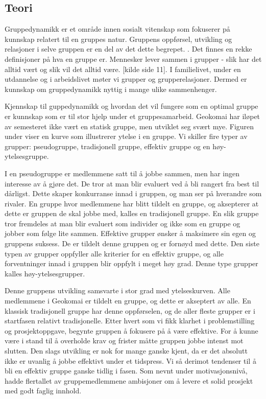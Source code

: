 \documentclass[a4paper,norsk,oneside]{article}
\begin{document}
\subsection{Teori}
Gruppedynamikk er et område innen sosialt vitenskap som fokuserer på kunnskap relatert til en gruppes natur. Gruppens oppførsel, utvikling og relasjoner i selve gruppen er en del av det dette begrepet. \cite{johnson2008joining}. Det finnes en rekke definisjoner på hva en gruppe er. Mennesker lever sammen i grupper - slik har det alltid vært og slik vil det alltid være. [kilde side 11]. I familielivet, under en utdannelse og i arbeidslivet møter vi grupper og grupperelasjoner. Dermed er kunnskap om gruppedynamikk nyttig i mange ulike sammenhenger. 

Kjennskap til guppedynamikk og hvordan det vil fungere som en optimal gruppe er kunnskap som er til stor hjelp under et gruppesamarbeid. Geokomai har iløpet av semesteret ikke vært en statisk gruppe, men utviklet seg svært mye. Figuren under viser en kurve som illustrerer ytelse i en gruppe. Vi skiller fire typer av grupper: pseudogruppe, tradisjonell gruppe, effektiv gruppe og en høy-ytelsesgruppe.\cite{johnson2008joining} 



I en pseudogruppe er medlemmene satt til å jobbe sammen, men har ingen interesse av å gjøre det. De tror at man blir evaluert ved å bli rangert fra best til dårligst. Dette skaper konkurranse innad i gruppen, og man ser på hverandre som rivaler. En gruppe hvor medlemmene har blitt tildelt en gruppe, og aksepterer at dette er gruppen de skal jobbe med, kalles en tradisjonell gruppe. En slik gruppe tror fremdeles at man blir evaluert som individer og ikke som en gruppe og jobber som følge lite sammen. Effektive grupper ønsker å maksimere sin egen og gruppens suksess. De er tildelt denne gruppen og er fornøyd med dette. Den siste typen av grupper oppfyller alle kriterier for en effektiv gruppe, og alle forventninger innad i gruppen blir oppfylt i meget høy grad. Denne type grupper kalles høy-ytelsesgrupper.

Denne gruppens utvikling samsvarte i stor grad med ytelseskurven. Alle medlemmene i Geokomai er tildelt en gruppe, og dette er akseptert av alle. En klassisk tradisjonell gruppe har denne oppførselen, og de aller fleste grupper er i startfasen relativt tradisjonelle. Etter hvert som vi fikk klarhet i problemstilling og prosjektoppgave, begynte gruppen å fokusere på å være effektive. For å kunne være i stand til å overholde krav og frister måtte gruppen jobbe intenst mot slutten. Den slags utvikling er nok for mange ganske kjent, da er det absolutt ikke er uvanlig å jobbe effektivt under et tidspress. Vi så derimot tendenser til å bli en effektiv gruppe ganske tidlig i fasen. Som nevnt under motivasjonsnivå, hadde flertallet av gruppemedlemmene ambisjoner om å levere et solid prosjekt med godt faglig innhold. 
\end{document}
